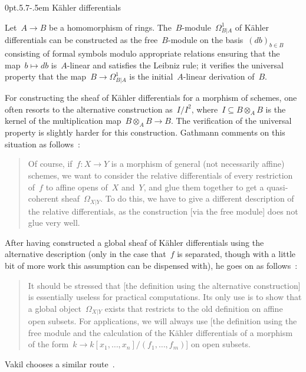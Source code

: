 \documentclass[10pt,reqno,a4paper]{amsbook}
\makeatletter
\theoremstyle{definition}
\theoremstyle{plain}
\theoremstyle{remark}
\newcommand{\?}{\,{:}\,}
\renewcommand{\_}{\mathpunct{.}\,}
\def\subsection{\@startsection{subsection}{2}%
  {0pt}{.5\linespacing\@plus.7\linespacing}{-.5em}%
  {\normalfont\bfseries}}
\makeatother
\begin{document}
\subsection{Kähler differentials}\label{sect:kaehler-differentials}

Let~$A \to B$ be a homomorphism of rings. The~$B$-module~$\Omega^1_{B|A}$ of
Kähler differentials can be constructed as the free~$B$-module on the
basis~$(db)_{b \in B}$ consisting of formal symbols modulo appropriate
relations ensuring that the map~$b \mapsto db$ is~$A$-linear and satisfies the
Leibniz rule; it verifies the universal property that the map~$B \to
\Omega^1_{B|A}$ is the initial~$A$-linear derivation of~$B$.

For constructing the sheaf of Kähler differentials for a morphism of schemes,
one often resorts to the alternative construction as~$I/I^2$, where~$I
\subseteq B \otimes_A B$ is the kernel of the multiplication map~$B \otimes_A B
\to B$. The verification of the universal property is slightly harder for this
construction. Gathmann comments on this situation as follows~\cite[p.~134]{gathmann:ag}:
\begin{quote}
Of course, if~$f : X \to Y$ is a morphism of general (not necessarily affine)
schemes, we want to consider the relative differentials of every restriction
of~$f$ to affine opens of~$X$ and~$Y$, and glue them together to get a quasi-coherent
sheaf~$\Omega_{X|Y}$. To do this, we have to give a different description of the relative
differentials, as the construction [via the free module] does not glue very well.
\end{quote}
After having constructed a global sheaf of Kähler differentials using the
alternative description (only in the case that~$f$ is separated, though with a
little bit of more work this assumption can be dispensed with), he goes on as
follows~\cite[Remark~7.4.8]{gathmann:ag}:
\begin{quote}
It should be stressed that [the definition using the alternative construction]
is essentially useless for practical computations. Its only use is to show that
a global object~$\Omega_{X|Y}$ exists that restricts to the old definition on
affine open subsets. For applications, we will always use [the definition using
the free module and the calculation of the Kähler differentials of a morphism
of the form~$k \to k[x_1,\ldots,x_n]/(f_1,\ldots,f_m)$] on open subsets.
\end{quote}
Vakil chooses a similar route~\cite[Section~21.2]{vakil:foag}.
\end{document}
